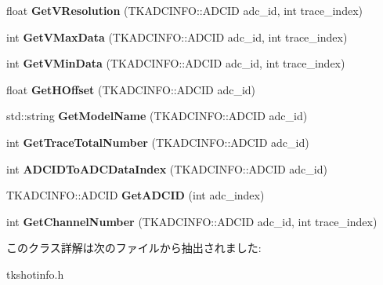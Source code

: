 \begin{DoxyCompactItemize}
\item 
\mbox{\label{class_t_k_s_h_o_t_a46eb57e1564b7f64647c4a7450219780}} 
float {\bfseries Get\+V\+Resolution} (T\+K\+A\+D\+C\+I\+N\+F\+O\+::\+A\+D\+C\+ID adc\+\_\+id, int trace\+\_\+index)
\item 
\mbox{\label{class_t_k_s_h_o_t_ad6d95c6c53f8b406e24fd05daa9a96b0}} 
int {\bfseries Get\+V\+Max\+Data} (T\+K\+A\+D\+C\+I\+N\+F\+O\+::\+A\+D\+C\+ID adc\+\_\+id, int trace\+\_\+index)
\item 
\mbox{\label{class_t_k_s_h_o_t_a65e951c7890ee7b9bef635beb54070cf}} 
int {\bfseries Get\+V\+Min\+Data} (T\+K\+A\+D\+C\+I\+N\+F\+O\+::\+A\+D\+C\+ID adc\+\_\+id, int trace\+\_\+index)
\item 
\mbox{\label{class_t_k_s_h_o_t_ae502263f7b666c4c7d1e5f044a89924f}} 
float {\bfseries Get\+H\+Offset} (T\+K\+A\+D\+C\+I\+N\+F\+O\+::\+A\+D\+C\+ID adc\+\_\+id)
\item 
\mbox{\label{class_t_k_s_h_o_t_a11a6d38c2cd9a720e5df9c7b482f479d}} 
std\+::string {\bfseries Get\+Model\+Name} (T\+K\+A\+D\+C\+I\+N\+F\+O\+::\+A\+D\+C\+ID adc\+\_\+id)
\item 
\mbox{\label{class_t_k_s_h_o_t_a283bdf8a375795d36e9a985dd2920bfa}} 
int {\bfseries Get\+Trace\+Total\+Number} (T\+K\+A\+D\+C\+I\+N\+F\+O\+::\+A\+D\+C\+ID adc\+\_\+id)
\item 
\mbox{\label{class_t_k_s_h_o_t_a9bc227a4b7645835e479fcbded5943bd}} 
int {\bfseries A\+D\+C\+I\+D\+To\+A\+D\+C\+Data\+Index} (T\+K\+A\+D\+C\+I\+N\+F\+O\+::\+A\+D\+C\+ID adc\+\_\+id)
\item 
\mbox{\label{class_t_k_s_h_o_t_a4194894bebb1794a6e5a89817f0deaf0}} 
T\+K\+A\+D\+C\+I\+N\+F\+O\+::\+A\+D\+C\+ID {\bfseries Get\+A\+D\+C\+ID} (int adc\+\_\+index)
\item 
\mbox{\label{class_t_k_s_h_o_t_ac7be926f62c580023119be4cb23fb4d2}} 
int {\bfseries Get\+Channel\+Number} (T\+K\+A\+D\+C\+I\+N\+F\+O\+::\+A\+D\+C\+ID adc\+\_\+id, int trace\+\_\+index)
\end{DoxyCompactItemize}


このクラス詳解は次のファイルから抽出されました\+:\begin{DoxyCompactItemize}
\item 
tkshotinfo.\+h\end{DoxyCompactItemize}
